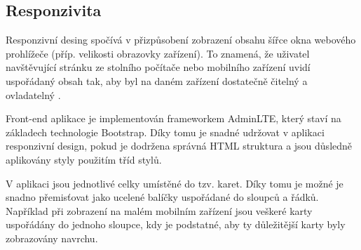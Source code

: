 \documentclass[czech,BP]{thesiskiv}
\begin{document}
	\subsection{Responzivita}
	\par Responzivní desing spočívá v přizpůsobení zobrazení obsahu šířce okna webového prohlížeče (příp. velikosti obrazovky zařízení). To znamená, že uživatel navštěvující stránku ze stolního počítače nebo mobilního zařízení uvidí uspořádaný obsah tak, aby byl na daném zařízení dostatečně čitelný a ovladatelný \cite{CSSOkamzite}.
	\par Front-end aplikace je implementován frameworkem AdminLTE, který staví na základech technologie Bootstrap. Díky tomu je snadné udržovat v aplikaci responzivní design, pokud je dodržena správná HTML struktura a jsou důsledně aplikovány styly použitím tříd stylů. 
	\par V aplikaci jsou jednotlivé celky umístěné do tzv. karet. Díky tomu je možné je snadno přemisťovat jako ucelené balíčky uspořádané do sloupců a řádků. Například při zobrazení na malém mobilním zařízení jsou veškeré karty uspořádány do jednoho sloupce, kdy je podstatné, aby ty důležitější karty byly zobrazovány navrchu.  
\end{document}
